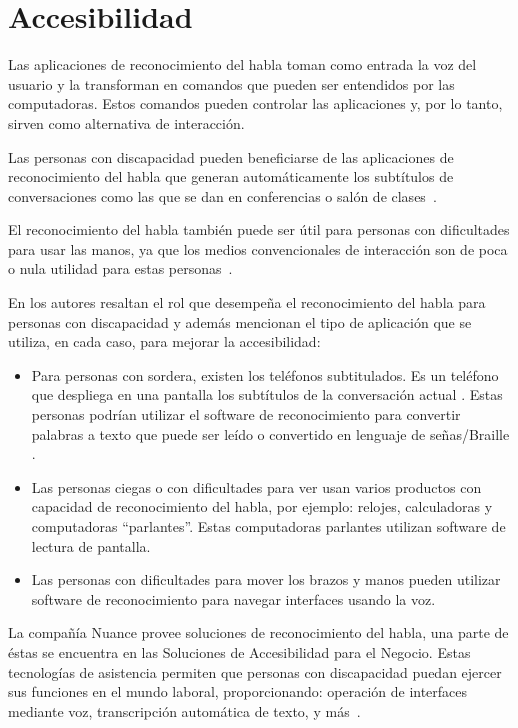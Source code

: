 \section{Accesibilidad}
\label{sec:accesibilidad}

Las aplicaciones de reconocimiento del habla toman como entrada la voz del usuario y la transforman en
comandos que pueden ser entendidos por las computadoras. Estos comandos pueden controlar las aplicaciones
y, por lo tanto, sirven como alternativa de interacci\'on.

Las personas con discapacidad pueden beneficiarse de las aplicaciones de reconocimiento del habla que
generan autom\'aticamente los subt\'itulos de conversaciones como las que se dan en conferencias o
sal\'on de \mbox{clases \cite{LeitchHow2002}.}

El reconocimiento del habla tambi\'en puede ser \'util para personas con dificultades para usar las manos, ya
que los medios convencionales de interacci\'on son de poca o nula utilidad para estas
\mbox{personas \cite{AnanthiSurvey2013}.}

En \cite{AnanthiSurvey2013} los autores resaltan el rol que desempe\~na el reconocimiento del habla para personas
con discapacidad y adem\'as mencionan el tipo de aplicaci\'on que se utiliza, en cada caso, para mejorar la accesibilidad:

\begin{itemize}
    \item Para personas con sordera, existen los tel\'efonos subtitulados. Es un tel\'efono que despliega en
	una pantalla los subt\'itulos de la conversaci\'on actual \cite{PerfettiReading2000}. Estas personas
	podr\'ian utilizar el software de reconocimiento para convertir palabras a texto que puede ser le\'ido o
	convertido en lenguaje de se\~nas/Braille \cite{SchilperoordNonverbatim2005}.
    \item Las personas ciegas o con dificultades para ver usan varios productos con capacidad de reconocimiento del habla,
	por ejemplo: relojes, calculadoras y computadoras ``parlantes''. Estas computadoras parlantes utilizan software
	de lectura de pantalla.
    \item Las personas con dificultades para mover los brazos y manos pueden utilizar software de reconocimiento para
	navegar interfaces usando la voz\cite{AnanthiSurvey2013}.
\end{itemize}

La compa\~n\'ia Nuance provee soluciones de reconocimiento del habla, una parte de \'estas se encuentra en las Soluciones de Accesibilidad
para el Negocio. Estas tecnolog\'ias de asistencia permiten que personas con discapacidad puedan ejercer sus funciones en el mundo laboral,
proporcionando: operaci\'on de interfaces mediante voz, transcripci\'on autom\'atica de texto,
y \mbox{m\'as \cite{NuanceAccessibility}.}

